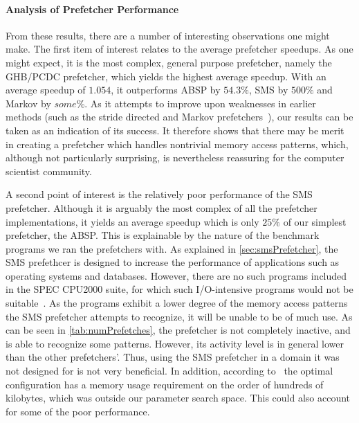 
\paragraph{Analysis of Prefetcher Performance}
\label{par:varprefperf}



From these results, there are a number of interesting observations one
might make. The first item of interest relates to the average
prefetcher speedups. As one might expect, it is the most complex,
general purpose prefetcher, namely the GHB/PCDC prefetcher, which
yields the highest average speedup. With an average speedup of
$1.054$, it outperforms ABSP by $54.3\%$, SMS by $500\%$ and Markov by
$some\%$. As it attempts to improve upon weaknesses in earlier methods
(such as the stride directed and Markov prefetchers~\cite{Nesbit}),
our results can be taken as an indication of its success. It therefore
shows that there may be merit in creating a prefetcher which handles
nontrivial memory access patterns, which, although not particularly
surprising, is nevertheless reassuring for the computer scientist
community.%

A second point of interest is the relatively poor performance of the
SMS prefetcher. Although it is arguably the most complex of all the
prefetcher implementations, it yields an average speedup which is only
$25\%$ of our simplest prefetcher, the ABSP. This is explainable by
the nature of the benchmark programs we ran the prefetchers with. As
explained in \autoref{sec:smsPrefetcher}, the SMS prefethcer is
designed to increase the performance of applications such as operating
systems and databases. However, there are no such programs included in
the SPEC CPU2000 suite, for which such I/O-intensive programs would
not be suitable~\cite{SPECFAQ}. As the programs exhibit a lower degree
of the memory access patterns the SMS prefetcher attempts to
recognize, it will be unable to be of much use. As can be seen in
\autoref{tab:numPrefetches}, the prefetcher is not completely
inactive, and is able to recognize some patterns. However, its
activity level is in general lower than the other prefetchers'. Thus,
using the SMS prefetcher in a domain it was not designed for is not
very beneficial. In addition, according to~\cite{SMS} the optimal
configuration has a memory usage requirement on the order of hundreds
of kilobytes, which was outside our parameter search space. This could
also account for some of the poor performance.

